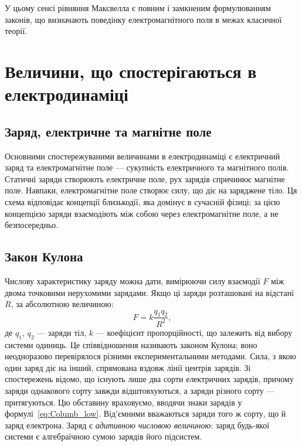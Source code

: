 У цьому сенсі рівняння Максвелла є повним і замкненим формулюванням законів, що визначають поведінку електромагнітного
поля в межах класичної теорії.

\section{Величини, що спостерігаються в електродинаміці}

\subsection*{Заряд, електричне та магнітне поле}

Основними спостережуваними величинами в електродинаміці є електричний заряд та електромагнітне
поле --- сукупність електричного та магнітного полів. Статичні заряди створюють електричне поле, рух зарядів спричинює
магнітне поле. Навпаки, електромагнітне поле створює силу, що діє на заряджене тіло. Ця схема відповідає концепції
близькодії, яка домінує в сучасній фізиці; за цією концепцією заряди взаємодіють між собою через електромагнітне поле, а
не безпосередньо.

\subsection*{Закон Кулона}

Числову характеристику заряду можна дати, вимірюючи силу взаємодії $F$ між двома точковими нерухомими
зарядами. Якщо ці заряди розташовані на відстані $R$, за абсолютною величиною:
\begin{equation}\label{eq:Columb_low}
	F = k \frac{q_1q_2}{R^2},
\end{equation}
де $q_1$, $q_2$ --- заряди тіл, $k$ --- коефіцієнт пропорційності, що залежить від вибору системи одиниць. Це
співвідношення називають законом Кулона; воно неодноразово перевірялося різними експериментальними методами. Сила, з
якою один заряд діє на інший, спрямована вздовж лінії центрів зарядів. Зі спостережень відомо, що існують лише два сорти
електричних зарядів, причому заряди однакового сорту завжди відштовхуються, а заряди різного сорту --- притягуються. Цю
обставину враховуємо, вводячи знаки зарядів у формулі~\eqref{eq:Columb_low}. Від'ємними вважаються заряди того ж сорту,
що й заряд електрона. Заряд є \emph{адитивною числовою величиною}: заряд будь-якої системи є
алгебраїчною сумою зарядів його підсистем.

